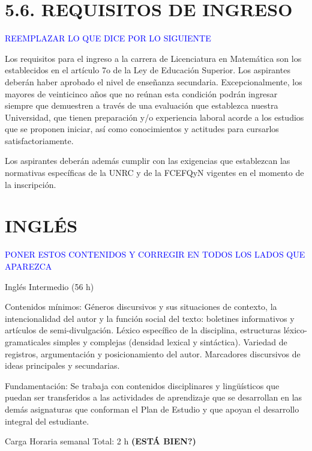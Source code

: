 \documentclass[a4paper, 12pt]{article}
\begin{document}
 

\section{5.6. REQUISITOS DE INGRESO} 

\textcolor{blue}{REEMPLAZAR LO QUE DICE POR LO SIGUIENTE}

Los requisitos para el ingreso a la carrera de Licenciatura en Matemática son los establecidos
en el artículo 7o de la Ley de Educación Superior. Los aspirantes deberán haber aprobado
el nivel de enseñanza secundaria. Excepcionalmente, los mayores de veinticinco años que
no reúnan esta condición podrán ingresar siempre que demuestren a través de una
evaluación que establezca nuestra Universidad, que tienen preparación y/o experiencia
laboral acorde a los estudios que se proponen iniciar, así como conocimientos y actitudes
para cursarlos satisfactoriamente.

Los aspirantes deberán además cumplir con las exigencias
 que establezcan las normativas específicas de la UNRC y de la FCEFQyN    vigentes en el momento 
 de la inscripción. 

 
\section{INGLÉS }

\textcolor{blue}{PONER ESTOS CONTENIDOS Y CORREGIR EN TODOS LOS LADOS QUE APAREZCA }


Inglés Intermedio (56 h)

 

Contenidos mínimos: Géneros discursivos y sus situaciones de contexto, la intencionalidad del autor y la función social del texto: boletines informativos y artículos de semi-divulgación. Léxico específico de la disciplina, estructuras léxico-gramaticales simples y complejas (densidad lexical y sintáctica). Variedad de registros, argumentación y posicionamiento del autor. Marcadores discursivos de ideas principales y secundarias.

 

Fundamentación: Se trabaja con contenidos disciplinares y lingüísticos que puedan ser transferidos a las actividades de aprendizaje que se desarrollan en las demás asignaturas que conforman el Plan de Estudio y que apoyan el desarrollo integral del estudiante.

 

Carga Horaria semanal Total: 2 h  \textbf{(ESTÁ BIEN?)}
\end{document}
